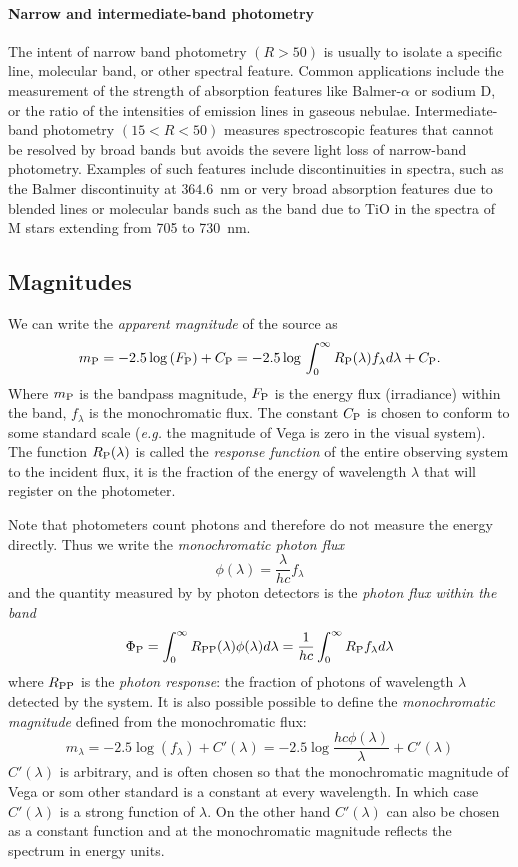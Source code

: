 \paragraph{Narrow and intermediate-band photometry} The intent of
narrow band photometry $(R>50)$ is usually to isolate a specific line,
molecular band, or other spectral feature. Common applications include
the measurement of the strength of absorption features like
Balmer-$\alpha$ or sodium D, or the ratio of the intensities of
emission lines in gaseous nebulae. Intermediate-band photometry
$(15<R<50)$ measures spectroscopic features that cannot be resolved by
broad bands but avoids the severe light loss of narrow-band
photometry. Examples of such features include discontinuities in
spectra, such as the Balmer discontinuity at $364.6$~nm or very broad
absorption features due to blended lines or molecular bands such as
the band due to TiO in the spectra of M stars extending from 705 to
730~nm.
\subsection{Magnitudes}
We can write the {\it apparent magnitude} of the source as 
\[
m_{\rm P}=-2.5\log{(F_{\rm P})}+C_{\rm
  P}=-2.5\log{}\int_0^\infty R_{\rm P}(\lambda)f_\lambda
d\lambda+C_{\rm P}.
\]
Where $m_{\rm P}$ is the bandpass magnitude, $F_{\rm P}$ is the energy
flux (irradiance) within the band, $f_\lambda$ is the monochromatic
flux. The constant $C_{\rm P}$ is chosen to conform to some standard
scale ({\it e.g.} the magnitude of Vega is zero in the visual
system). The function $R_{\rm P}(\lambda)$ is called the {\it response
  function} of the entire observing system to the incident flux, it is
the fraction of the energy of wavelength $\lambda$ that will register
on the photometer.

Note that photometers count photons and therefore do not measure the
energy directly. Thus we write the {\it monochromatic photon flux} 
\[
\phi(\lambda)=\frac{\lambda}{hc}f_\lambda
\]
and the quantity measured by by photon detectors is the {\it photon
  flux within the band}
\[
\Phi_{\rm P}=\int_0^\infty R_{\rm
  PP}(\lambda)\phi(\lambda)d\lambda=\frac{1}{hc}\int_0^\infty R_{\rm
  P}f_\lambda d\lambda
\]
where $R_{\rm PP}$ is the {\it photon response}: the fraction of
photons of wavelength $\lambda$ detected by the system. It is also
possible possible to define the {\it monochromatic magnitude} defined
from the monochromatic flux:
\[
m_\lambda=-2.5\log{(f_\lambda)}+C'(\lambda)=-2.5\log{\frac{hc\phi(\lambda)}{\lambda}}+C'(\lambda)
\]
$C'(\lambda)$ is arbitrary, and is often chosen so that the
monochromatic magnitude of Vega or som other standard is a constant
at every wavelength. In which case $C'(\lambda)$ is a strong function
of $\lambda$. On the other hand $C'(\lambda)$ can also be chosen as a
constant function and at the monochromatic magnitude reflects the
spectrum in energy units. 
